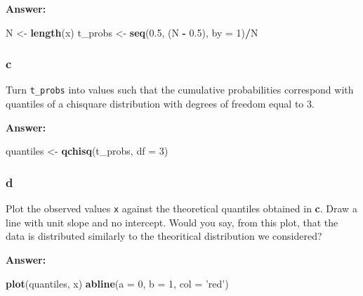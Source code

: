 \documentclass[]{article}
\newenvironment{Shaded}{\begin{snugshade}}{\end{snugshade}}
\newcommand{\DataTypeTok}[1]{\textcolor[rgb]{0.13,0.29,0.53}{#1}}
\newcommand{\DecValTok}[1]{\textcolor[rgb]{0.00,0.00,0.81}{#1}}
\newcommand{\FloatTok}[1]{\textcolor[rgb]{0.00,0.00,0.81}{#1}}
\newcommand{\KeywordTok}[1]{\textcolor[rgb]{0.13,0.29,0.53}{\textbf{#1}}}
\newcommand{\NormalTok}[1]{#1}
\newcommand{\OperatorTok}[1]{\textcolor[rgb]{0.81,0.36,0.00}{\textbf{#1}}}
\newcommand{\StringTok}[1]{\textcolor[rgb]{0.31,0.60,0.02}{#1}}
\begin{document}
\textbf{Answer:}

\begin{Shaded}
\begin{Highlighting}[]
\NormalTok{N <-}\StringTok{ }\KeywordTok{length}\NormalTok{(x)}
\NormalTok{t_probs <-}\StringTok{ }\KeywordTok{seq}\NormalTok{(}\FloatTok{0.5}\NormalTok{, (N }\OperatorTok{-}\StringTok{ }\FloatTok{0.5}\NormalTok{), }\DataTypeTok{by =} \DecValTok{1}\NormalTok{)}\OperatorTok{/}\NormalTok{N}
\end{Highlighting}
\end{Shaded}

\hypertarget{c-6}{%
\subsubsection{c}\label{c-6}}

Turn \texttt{t\_probs} into values such that the cumulative
probabilities correspond with quantiles of a chisquare distribution with
degrees of freedom equal to \(3\).

\textbf{Answer:}

\begin{Shaded}
\begin{Highlighting}[]
\NormalTok{quantiles <-}\StringTok{ }\KeywordTok{qchisq}\NormalTok{(t_probs, }\DataTypeTok{df =} \DecValTok{3}\NormalTok{)}
\end{Highlighting}
\end{Shaded}

\hypertarget{d-5}{%
\subsubsection{d}\label{d-5}}

Plot the observed values \texttt{x} against the theoretical quantiles
obtained in \textbf{c}. Draw a line with unit slope and no intercept.
Would you say, from this plot, that the data is distributed similarly to
the theoritical distribution we considered?

\textbf{Answer:}

\begin{Shaded}
\begin{Highlighting}[]
\KeywordTok{plot}\NormalTok{(quantiles, x)}
\KeywordTok{abline}\NormalTok{(}\DataTypeTok{a =} \DecValTok{0}\NormalTok{, }\DataTypeTok{b =} \DecValTok{1}\NormalTok{, }\DataTypeTok{col =} \StringTok{'red'}\NormalTok{)}
\end{Highlighting}
\end{Shaded}
\end{document}
